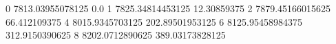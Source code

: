 0 7813.03955078125 0.0
1 7825.34814453125 12.30859375
2 7879.45166015625 66.412109375
4 8015.9345703125 202.89501953125
6 8125.95458984375 312.9150390625
8 8202.0712890625 389.03173828125
